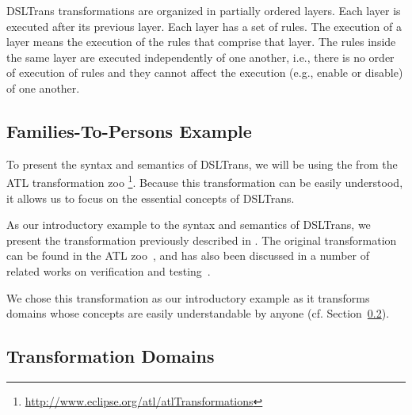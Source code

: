 DSLTrans transformations are organized in partially ordered
layers.
Each layer is executed after its previous layer. Each layer has a set of rules.
The execution of a layer means the execution of the rules that comprise that
layer.
The rules inside the same layer are executed independently of one another, i.e.,
there is no order of execution of rules and they cannot affect the execution
(e.g., enable or disable) of one another. 



\subsection{Families-To-Persons Example}

To present the syntax and semantics of DSLTrans, we will be using the \FTP from the ATL transformation zoo \footnote{\url{http://www.eclipse.org/atl/atlTransformations}}.
Because this transformation can be easily understood, it allows us to focus on the essential concepts of DSLTrans.


As our introductory example to the syntax and semantics of DSLTrans, we present the \FTP transformation previously described in \cite{Oakes2016}. The original \FTP transformation can be
found in the ATL zoo~\cite{atlZoo}, and has also been discussed in a number of related works on verification and testing~\cite{Gogolla2011}.

We chose this \FTP transformation as our introductory example as it transforms domains whose concepts are easily understandable by anyone (cf. Section~\ref{sec:trans_domain}).

\subsection{Transformation Domains}\label{sec:trans_domain}

